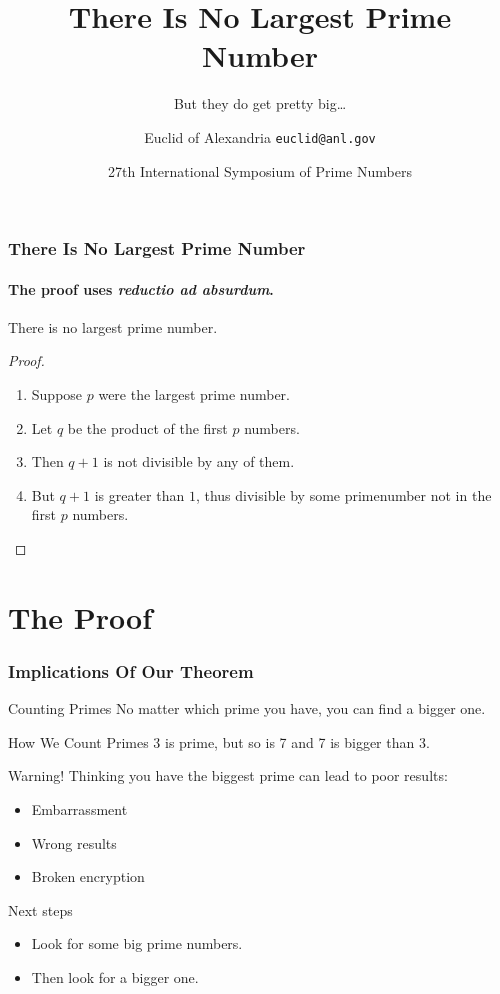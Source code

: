 \documentclass[aspectratio=43]{beamer}
\title{There Is No Largest Prime Number}
\subtitle{But they do get pretty big\ldots}
\date[ISPN ’80]{27th International Symposium of Prime Numbers}
\author[Euclid]{Euclid of Alexandria \texttt{euclid@anl.gov}}
\begin{document}
\begin{frame}
\titlepage
\end{frame}

\begin{frame}
  \frametitle{There Is No Largest Prime Number}
  \framesubtitle{The proof uses \textit{reductio ad absurdum}.}
  \begin{theorem}
    There is no largest prime number.
  \end{theorem}
  \begin{proof}
    \begin{enumerate}
    \item<1-| alert@1> Suppose $p$ were the largest prime number.
    \item<2-> Let $q$ be the product of the first $p$ numbers.
    \item<3-> Then $q+1$ is not divisible by any of them.
    \item<1-> But $q + 1$ is greater than $1$, thus divisible by some primenumber not in the first $p$ numbers.
      \qedhere
    \end{enumerate}
  \end{proof}
\end{frame}

\section{The Proof}

\begin{frame}{}
\tableofcontents
\end{frame}

\begin{frame}
  \frametitle{Implications Of Our Theorem}
  \begin{block}{Counting Primes}
    No matter which prime you have, you can find a bigger one.
  \end{block}
  \begin{exampleblock}{How We Count Primes}
    3 is prime, but so is 7 and 7 is bigger than 3.
  \end{exampleblock}
  \begin{alertblock}{Warning!}
    Thinking you have the biggest prime can lead to poor results:
    \begin{itemize}
    \item Embarrassment
    \item Wrong results
    \item Broken encryption
    \end{itemize}
  \end{alertblock}
\end{frame}

\begin{frame}{Next steps}
  \begin{itemize}
  \item Look for some big prime numbers.
  \item Then look for a bigger one.
  \end{itemize}
\end{frame}
\end{document}
